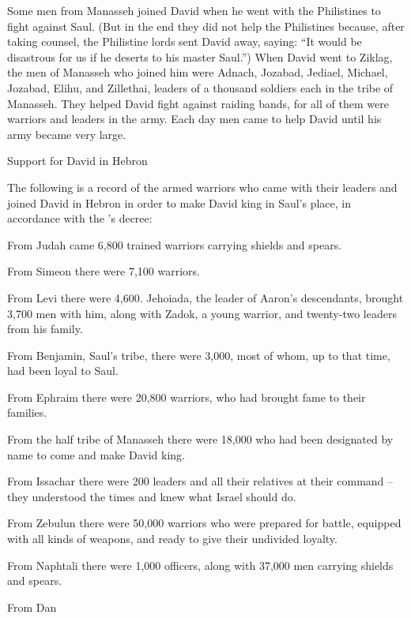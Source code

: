 {\par }{\PP {}Some
men from Manasseh
joined
David
when he went
with the Philistines
to fight
against
Saul.
(But in the end they did not help
the Philistines because, after taking counsel,
the Philistine
lords
sent
David away, saying: “It would be disastrous
for us if he deserts to his master
Saul.”)
When David went
to Ziklag,
the men of Manasseh
who joined
him were Adnach,
Jozabad,
Jediael,
Michael,
Jozabad,
Elihu,
and Zillethai,
leaders
of a thousand
soldiers each in the tribe of Manasseh.
They helped
David
fight against
raiding bands,
for all
of them were
warriors
and leaders
in the army.
Each
day
men
came
to help
David
until
his army
became very large.
\par }{\SH Support for David in Hebron
\par }{\PP {}The following
is a record
of the armed
warriors
who came
with their leaders
and joined David
in Hebron
in order to make
David king
in Saul’s
place, in accordance with the
{}’s
decree:
\par }{\PP {}From Judah
came 6,800
trained
warriors
carrying
shields
and spears.
\par }{\PP {}From Simeon
there were 7,100
warriors.
\par }{\PP {}From Levi
there were 4,600.
Jehoiada,
the leader
of Aaron’s descendants,
brought 3,700 men with him,
along with Zadok,
a young
warrior,
and twenty-two
leaders
from his family.
\par }{\PP {}From Benjamin,
Saul’s
tribe,
there were 3,000,
most of whom,
up to
that time,
had been loyal
to Saul.
\par }{\PP {}From Ephraim
there were 20,800
warriors,
who had brought fame
to their families.
\par }{\PP {}From the half
tribe
of Manasseh
there were 18,000
who had
been designated
by name
to come
and make
David
king.
\par }{\PP {}From Issachar
there were 200
leaders
and all
their relatives
at their command
– they understood
the times
and knew
what
Israel
should do.
\par }{\PP {}From Zebulun
there were 50,000
warriors
who were prepared
for battle,
equipped with all
kinds of weapons,
and ready to give their undivided loyalty.
\par }{\PP {}From Naphtali
there were 1,000
officers,
along with 37,000
men carrying shields
and spears.
\par }{\PP {}From Dan
}
